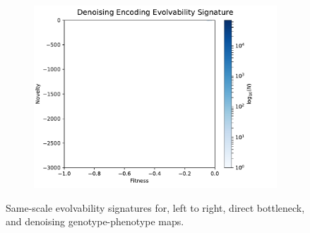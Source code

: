 \begin{figure}
\begin{subfigure}[b]{0.33\textwidth}
                \includegraphics[width=\linewidth]{img/noise_es_scaled}
        \end{subfigure}
        \caption{Same-scale evolvability signatures for, left to right, direct bottleneck, and denoising genotype-phenotype maps.}
        \label{fig:all_es_scaled}
\end{figure}
